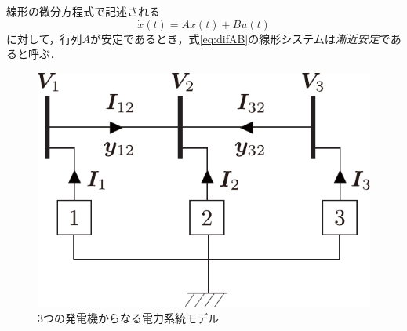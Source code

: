\documentclass[a4j,10pt,oneside,openany,dvipdfmx]{jsbook}
\begin{document}
\begin{definition}\label{def:difsta}
線形の微分方程式で記述される
\begin{equation}\label{eq:difAB}
\dot{x}(t)=Ax(t) +Bu(t)
\end{equation}
に対して，行列$A$が安定であるとき，式\eqref{eq:difAB}の線形システムは\emph{漸近安定}であると呼ぶ．
\end{definition}

\begin{figure}[t]
\centering
\includegraphics[width = .30\linewidth]{figs/3busex}
\caption{3つの発電機からなる電力系統モデル}
\label{fig:3genex}
\end{figure}
\end{document}
